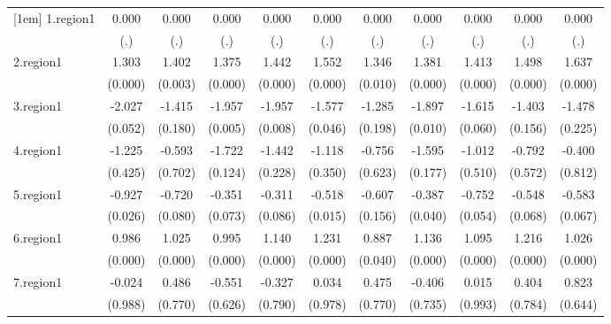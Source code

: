 \begin{tabular}{l*{10}{c}}
[1em]
1.region1   &       0.000&       0.000&       0.000&       0.000&       0.000&       0.000&       0.000&       0.000&       0.000&       0.000\\
            &         (.)&         (.)&         (.)&         (.)&         (.)&         (.)&         (.)&         (.)&         (.)&         (.)\\
[1em]
2.region1   &       1.303&       1.402&       1.375&       1.442&       1.552&       1.346&       1.381&       1.413&       1.498&       1.637\\
            &     (0.000)&     (0.003)&     (0.000)&     (0.000)&     (0.000)&     (0.010)&     (0.000)&     (0.000)&     (0.000)&     (0.000)\\
[1em]
3.region1   &      -2.027&      -1.415&      -1.957&      -1.957&      -1.577&      -1.285&      -1.897&      -1.615&      -1.403&      -1.478\\
            &     (0.052)&     (0.180)&     (0.005)&     (0.008)&     (0.046)&     (0.198)&     (0.010)&     (0.060)&     (0.156)&     (0.225)\\
[1em]
4.region1   &      -1.225&      -0.593&      -1.722&      -1.442&      -1.118&      -0.756&      -1.595&      -1.012&      -0.792&      -0.400\\
            &     (0.425)&     (0.702)&     (0.124)&     (0.228)&     (0.350)&     (0.623)&     (0.177)&     (0.510)&     (0.572)&     (0.812)\\
[1em]
5.region1   &      -0.927&      -0.720&      -0.351&      -0.311&      -0.518&      -0.607&      -0.387&      -0.752&      -0.548&      -0.583\\
            &     (0.026)&     (0.080)&     (0.073)&     (0.086)&     (0.015)&     (0.156)&     (0.040)&     (0.054)&     (0.068)&     (0.067)\\
[1em]
6.region1   &       0.986&       1.025&       0.995&       1.140&       1.231&       0.887&       1.136&       1.095&       1.216&       1.026\\
            &     (0.000)&     (0.000)&     (0.000)&     (0.000)&     (0.000)&     (0.040)&     (0.000)&     (0.000)&     (0.000)&     (0.000)\\
[1em]
7.region1   &      -0.024&       0.486&      -0.551&      -0.327&       0.034&       0.475&      -0.406&       0.015&       0.404&       0.823\\
            &     (0.988)&     (0.770)&     (0.626)&     (0.790)&     (0.978)&     (0.770)&     (0.735)&     (0.993)&     (0.784)&     (0.644)\\

\end{tabular}
